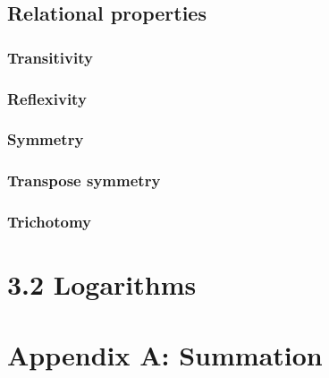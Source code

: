 \documentclass{article}
\begin{document}
\subsection*{Relational properties}


\subsubsection*{Transitivity}


\subsubsection*{Reflexivity}


\subsubsection*{Symmetry}


\subsubsection*{Transpose symmetry}


\subsubsection*{Trichotomy}


\section*{3.2 Logarithms}


\section*{Appendix A: Summation}
\end{document}
